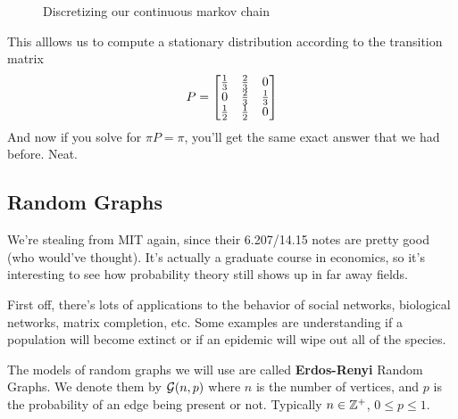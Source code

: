 \documentclass[11 pt]{scrartcl}
\begin{document}
\begin{figure}[!ht]
\begin{center}
\end{center}
\caption{Discretizing our continuous markov chain}
\end{figure}

This alllows us to compute a stationary distribution according to the transition matrix 
\[ P = \begin{bmatrix} \frac13 & \frac23 & 0 \\ 
            0       & \frac23 & \frac13 \\ 
            \frac12 & \frac12 & 0 \end{bmatrix} 
        \] 
        And now if you solve for $\pi P = \pi$, you'll get the same exact answer that we had before. Neat. 

\subsection{Random Graphs}
We're stealing from MIT again, since their 6.207/14.15 notes are pretty good (who would've thought). It's actually a graduate course in economics, so it's interesting to see how probability theory still shows up in far away fields. 

First off, there's lots of applications to the behavior of social networks, biological networks, matrix completion, etc. Some examples are understanding if a population will become extinct or if an epidemic will wipe out all of the species. 

\begin{definition}
The models of random graphs we will use are called \textbf{Erdos-Renyi} Random Graphs. We denote them by $\mathcal G(n,p)$ where $n$ is the number of vertices, and $p$ is the probability of an edge being present or not. Typically $n\in \mathbb Z^+$, $0\leq p \leq 1$.
\end{definition}
\end{document}
